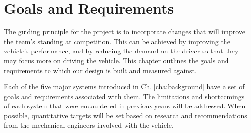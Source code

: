 \chapter{Goals and Requirements\label{cha:goals}}

The guiding principle for the project is to incorporate changes that will improve the team's standing at competition. This can be achieved by improving the vehicle's performance, and by reducing the demand on the driver so that they may focus more on driving the vehicle. This chapter outlines the goals and requirements to which our design is built and measured against.

Each of the five major systems introduced in Ch. \ref{cha:background} have a set of goals and requirements associated with them. The limitations and shortcomings of each system that were encountered in previous years will be addressed. When possible, quantitative targets will be set based on research and recommendations from the mechanical engineers involved with the vehicle.






